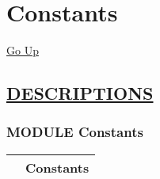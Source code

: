 \chapter*{\color{headfile}
Constants
}
\hypertarget{ecldoc:toc:Constants}{}
\hyperlink{ecldoc:toc:root}{Go Up}


\section*{\underline{\textsf{DESCRIPTIONS}}}
\subsection*{\textsf{\colorbox{headtoc}{\color{white} MODULE}
Constants}}

\hypertarget{ecldoc:Constants}{}

{\renewcommand{\arraystretch}{1.5}
\begin{tabularx}{\textwidth}{|>{\raggedright\arraybackslash}l|X|}
\hline
\hspace{0pt}\mytexttt{\color{red} } & \textbf{Constants} \\
\hline
\end{tabularx}
}

\par


